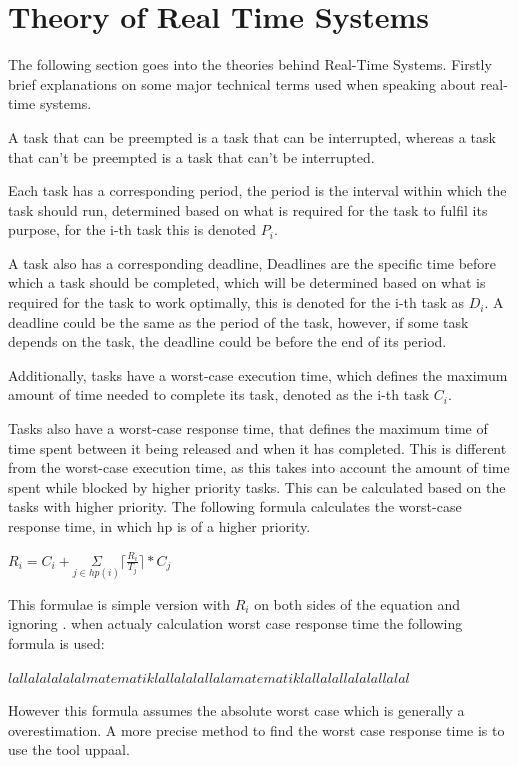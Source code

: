 \section{Theory of Real Time Systems}
The following section goes into the theories behind Real-Time Systems. Firstly brief explanations on some major technical terms used when speaking about real-time systems. 

A task that can be preempted is a task that can be interrupted, whereas a task that can't be preempted is a task that can't be interrupted.

Each task has a corresponding period, the period is the interval within which the task should run, determined based on what is required for the task to fulfil its purpose, for the i-th task this is denoted $P_{i}$.


A task also has a corresponding deadline, Deadlines are the specific time before which a task should be completed, which will be determined based on what is required for the task to work optimally, this is denoted for the i-th task as $ D_{i} $. A deadline could be the same as the period of the task, however, if some task depends on the task, the deadline could be before the end of its period. 

Additionally, tasks have a worst-case execution time, which defines the maximum amount of time needed to complete its task, denoted as the i-th task $C_{i}$.

Tasks also have a worst-case response time, that defines the maximum time of time spent between it being released and when it has completed. This is different from the worst-case execution time, as this takes into account the amount of time spent while blocked by higher priority tasks. This can be calculated based on the tasks with higher priority. The following formula calculates the worst-case response time, in which hp is of a higher priority.

$R_{i} = C_{i} + \underset{j\in hp(i)}{\Sigma} \lceil\frac{R_{i}}{T_{j}}\rceil*C_{j} $

This formulae is simple version with $R_{i}$ on both sides of the equation and ignoring . when actualy calculation worst case response time the following formula is used:

$ lallalalalalal matematik lallalalallala matematik lallalallalalallalal$

However this formula assumes the absolute worst case which is generally a overestimation. A more precise method to find the worst case response time is to use the tool uppaal.


